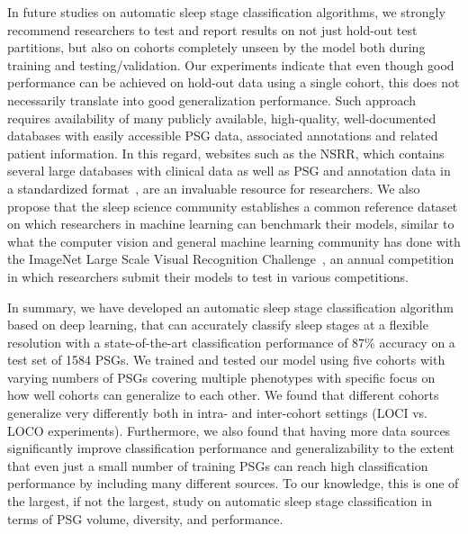In future studies on automatic sleep stage classification algorithms, we strongly recommend researchers to test and report results on not just hold-out test partitions, but also on cohorts completely unseen by the model both during training and testing/validation.
Our experiments indicate that even though good performance can be achieved on hold-out data using a single cohort, this does not necessarily translate into good generalization performance.
Such approach requires availability of many publicly available, high-quality, well-documented databases with easily accessible \ac{PSG} data, associated annotations and related patient information.
In this regard, websites such as the \ac{NSRR}, which contains several large databases with clinical data as well as \ac{PSG} and annotation data in a standardized format~\cite{Dean2016,Zhang2018}, are an invaluable resource for researchers. 
We also propose that the sleep science community establishes a common reference dataset on which researchers in machine learning can benchmark their models, similar to what the computer vision and general machine learning community has done with the ImageNet Large Scale Visual Recognition Challenge~\cite{Russakovsky2015}, an annual competition in which researchers submit their models to test in various competitions.

In summary, we have developed an automatic sleep stage classification algorithm based on deep learning, that can accurately classify sleep stages at a flexible resolution with a state-of-the-art classification performance of 87\% accuracy on a test set of 1584 \acp{PSG}.
We trained and tested our model using five cohorts with varying numbers of \acp{PSG} covering multiple phenotypes with specific focus on how well cohorts can generalize to each other.
We found that different cohorts generalize very differently both in intra- and inter-cohort settings (\ac{LOCI} vs. \ac{LOCO} experiments).
Furthermore, we also found that having more data sources significantly improve classification performance and generalizability to the extent that even just a small number of training \acp{PSG} can reach high classification performance by including many different sources.
To our knowledge, this is one of the largest, if not the largest, study on automatic sleep stage classification in terms of \ac{PSG} volume, diversity, and performance.
